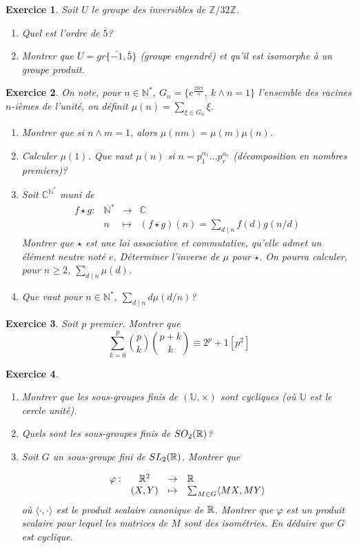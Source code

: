 \documentclass[12pt]{article}
\newtheorem{exercise}{Exercice}[section]
\theoremstyle{remark}
\theoremstyle{remark}
\newcommand{\C}{\mathbb{C}} \newcommand{\Q}{\mathbb{Q}}
\newcommand{\N}{\mathbb{N}} \newcommand{\Z}{\mathbb{Z}}
\newcommand{\U}{\mathbb{U}} \newcommand{\E}{\mathbb{E}}
\newcommand{\function}[5]{
	$$
	\begin{array}{rccl}
		#1: & #2 & \to & #3 \\
		& #4 & \mapsto & #5
	\end{array}
	$$
}
\begin{document}
\begin{exercise}
	Soit $U$ le groupe des inversibles de $\Z/32\Z$.
	\begin{enumerate}
		\item
		Quel est l'ordre de $\bar{5}$?
		\item
		Montrer que $U=gr\{\bar{-1},\bar{5}\}$ (groupe engendré) et qu'il est
		isomorphe à un groupe produit.
	\end{enumerate}
\end{exercise}

\begin{exercise}
	On note, pour $n\in\N^{*}$, $G_{n}=\{e^{\frac{2\mathrm{i}k\pi}{n}},~k\wedge
	n=1\}$ l'ensemble des racines $n$-ièmes de l'unité, on définit
	$\mu(n)=\sum_{\xi\in G_{n}}\xi$.
	\begin{enumerate}
		\item
		Montrer que si $n\wedge m=1$, alors $\mu(nm)=\mu(m)\mu(n)$.
		\item
		Calculer $\mu(1)$. Que vaut $\mu(n)$ si $n=p_{1}^{\alpha_{1}}\dots
		p_{r}^{\alpha_{r}}$ (décomposition en nombres premiers)?
		\item
		Soit $\C^{\N^{*}}$ muni de \function{f\star g}{\N^*}{\C}{n}{(f\star
		g)(n)=\sum_{d\mid n}f(d)g(n/d)} Montrer que $\star$ est une loi
		associative et commutative, qu'elle admet un élément neutre noté $e$.
		Déterminer l'inverse de $\mu$ pour $\star$. On pourra calculer, pour
		$n\geqslant2$, $\sum_{d\mid n}\mu(d)$.
		\item
		Que vaut pour $n\in\N^{*}$, $\sum_{d\mid n}d\mu(d/n)$?
	\end{enumerate}
\end{exercise}

\begin{exercise}
	Soit $p$ premier. Montrer que
	$$\sum_{k=0}^{p}\binom{p}{k}\binom{p+k}{k}\equiv 2^{p}+1[p^{2}]$$
\end{exercise}

\begin{exercise}
	\phantom{}
	\begin{enumerate}
		\item
		Montrer que les sous-groupes finis de $(\U,\times)$ sont cycliques (où
		$\U$ est le cercle unité).
		\item
		Quels sont les sous-groupes finis de $SO_{2}(\mathbb{R})$?
		\item
		Soit $G$ un sous-groupe fini de $SL_{2}(\mathbb{R})$. Montrer que
		\function{\varphi}{\R^2}{\R}{(X,Y)}{\sum_{M\in G}\langle MX,MY\rangle} où
		$\langle\cdot,\cdot\rangle$ est le produit scalaire canonique de $\mathbb{R}$.
		Montrer que $\varphi$ est un produit scalaire pour lequel les matrices de
		$M$ sont des isométries. En déduire que $G$ est cyclique.
	\end{enumerate}
\end{exercise}
\end{document}

